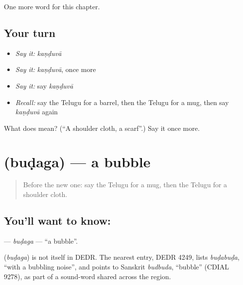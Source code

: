 \begin{grammarlens}[title={What you've built}]
One more word for this chapter.
\end{grammarlens}

\subsection*{Your turn}
\begin{itemize}
\raggedright
  \item \emph{Say it:} \emph{kaṇḍuvā}
  \item \emph{Say it:} \emph{kaṇḍuvā}, once more
  \item \emph{Say it:} say \emph{kaṇḍuvā}
  \item \emph{Recall:} say the Telugu for a barrel, then the Telugu for a mug, then say \emph{kaṇḍuvā} again
\end{itemize}

\begin{tcolorbox}[breakable,colback=teal!4,colframe=teal!35!black,title={Before you move on}]
What does  mean? (\textquotedblleft{}A shoulder cloth, a scarf\textquotedblright{}.) Say it once more.
\end{tcolorbox}
\section[\texorpdfstring{\te{బుడగ} (buḍaga)}{బుడగ (buḍaga)}]{ (buḍaga) — a bubble}

\label{lesson:TE-C233-budaga}



\begin{quote}
Before the new one: say the Telugu for a mug, then the Telugu for a shoulder cloth.
\end{quote}

\subsection*{You'll want to know: }
\textbf{} — \emph{buḍaga} — \textquotedblleft{}a bubble\textquotedblright{}.

\begin{cousinweb}
\textbf{} (\emph{buḍaga}) is not itself in DEDR. The nearest entry, DEDR 4249, lists \emph{buḍabuḍa}, \textquotedblleft{}with a bubbling noise\textquotedblright{}, and points to Sanskrit \emph{budbuda}, \textquotedblleft{}bubble\textquotedblright{} (CDIAL 9278), as part of a sound-word shared across the region.
\end{cousinweb}

